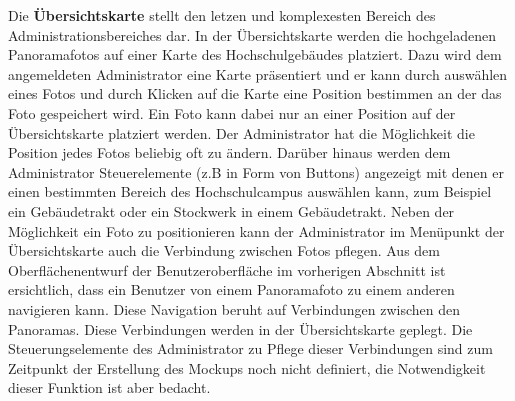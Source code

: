 
Die \textbf{Übersichtskarte} stellt den letzen und komplexesten Bereich des Administrationsbereiches dar. In der Übersichtskarte werden die hochgeladenen Panoramafotos auf einer Karte des Hochschulgebäudes platziert. Dazu wird dem angemeldeten Administrator eine Karte präsentiert und er kann durch auswählen eines Fotos und durch Klicken auf die Karte eine Position bestimmen an der das Foto gespeichert wird. Ein Foto kann dabei nur an einer Position auf der Übersichtskarte platziert werden. Der Administrator hat die Möglichkeit die Position jedes Fotos beliebig oft zu ändern. Darüber hinaus werden dem Administrator Steuerelemente (z.B in Form von Buttons) angezeigt mit denen er einen bestimmten Bereich des Hochschulcampus auswählen kann, zum Beispiel ein Gebäudetrakt oder ein Stockwerk in einem Gebäudetrakt. Neben der Möglichkeit ein Foto zu positionieren kann der Administrator im Menüpunkt der Übersichtskarte auch die Verbindung zwischen Fotos pflegen. Aus dem Oberflächenentwurf der Benutzeroberfläche im vorherigen Abschnitt ist ersichtlich, dass ein Benutzer von einem Panoramafoto zu einem anderen navigieren kann. Diese Navigation beruht auf Verbindungen zwischen den Panoramas. Diese Verbindungen werden in der Übersichtskarte geplegt. Die Steuerungselemente des Administrator zu Pflege dieser Verbindungen sind zum Zeitpunkt der Erstellung des Mockups noch nicht definiert, die Notwendigkeit dieser Funktion ist aber bedacht.